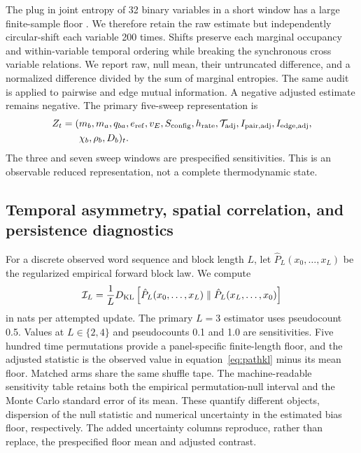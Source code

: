 \documentclass[12pt]{article}
\newcommand{\KL}{D_{\mathrm{KL}}}
\begin{document}
The plug in joint entropy of 32 binary variables in a short window has a large
finite-sample floor \cite{paninski2003}.  We therefore retain the raw estimate
but independently circular-shift each variable 200 times.  Shifts preserve
each marginal occupancy and within-variable temporal ordering while breaking the
synchronous cross variable relations.  We report raw, null mean, their
untruncated difference, and a normalized difference divided by the sum of
marginal entropies.  The same audit is applied to pairwise and edge mutual
information.  A negative adjusted estimate remains negative.
The primary five-sweep representation is
\begin{align}
Z_t=(&m_b,m_a,q_{ba},e_{\mathrm{ref}},v_E,S_{\mathrm{config}},h_{\mathrm{rate}},
{\cal T}_{\mathrm{adj}},I_{\mathrm{pair,adj}},I_{\mathrm{edge,adj}},\nonumber\\
&\chi_b,\rho_b,D_b)_t .
\end{align}
The three and seven sweep windows are prespecified sensitivities.  This is an
observable reduced representation, not a complete thermodynamic state.







\subsection{Temporal asymmetry, spatial correlation, and persistence diagnostics}
\label{sec:path-asymmetry}

For a discrete observed word sequence and block length $L$, let
$\hat P_L(x_0,\ldots,x_L)$ be the regularized empirical forward block law.
We compute
\begin{equation}
{\cal I}_L=\frac{1}{L}
\KL\left[\hat P_L(x_0,\ldots,x_L)\parallel
\hat P_L(x_L,\ldots,x_0)\right]
\label{eq:pathkl}
\end{equation}
in nats per attempted update.  The primary $L=3$ estimator uses pseudocount
0.5.  Values at $L\in\{2,4\}$ and pseudocounts 0.1 and 1.0 are sensitivities.
Five hundred time permutations provide a panel-specific finite-length floor,
and the adjusted statistic is the observed value in
equation~\eqref{eq:pathkl} minus its mean floor.
Matched arms share the same shuffle tape.  The machine-readable sensitivity
table retains both the empirical permutation-null interval and the Monte Carlo
standard error of its mean.  These quantify different objects, dispersion of
the null statistic and numerical uncertainty in the estimated bias floor,
respectively.  The added uncertainty columns reproduce, rather than replace,
the prespecified floor mean and adjusted contrast.
\end{document}
